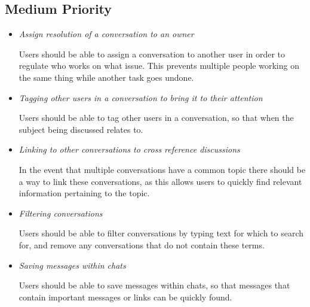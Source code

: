 \documentclass[a4paper]{l3proj}
\begin{document}
\subsection{Medium Priority}
\begin{itemize}
\item \textit{Assign resolution of a conversation to an owner} \par
Users should be able to assign a conversation to another user in order to regulate who works on what issue.  This prevents multiple people working on the same thing while another task goes undone.
\item \textit{Tagging other users in a conversation to bring it to their attention} \par
Users should be able to tag other users in a conversation, so that when the subject being discussed relates to.
\item \textit{Linking to other conversations to cross reference discussions} \par
In the event that multiple conversations have a common topic there should be a way to link these conversations, as this allows users to quickly find relevant information pertaining to the topic.
\item \textit{Filtering conversations} \par
Users should be able to filter conversations by typing text for which to search for, and remove any conversations that do not contain these terms.
\item \textit{Saving messages within chats} \par
Users should be able to save messages within chats, so that messages that contain important messages or links can be quickly found.

\end{itemize}
\end{document}
